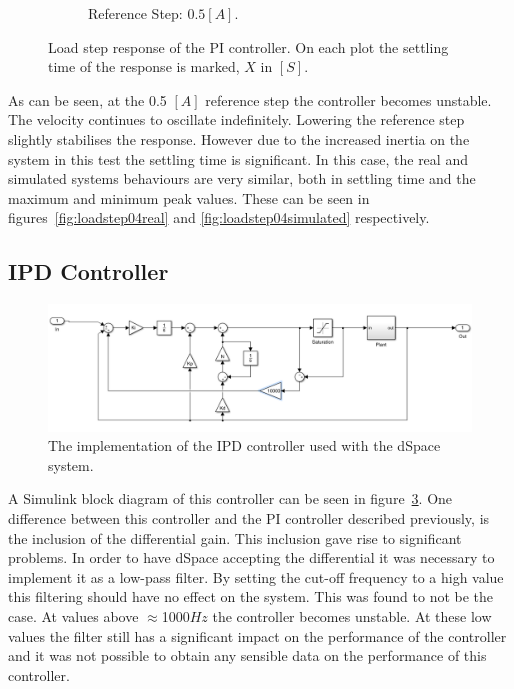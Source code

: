 \begin{figure}
\begin{subfigure}[t]{.49\linewidth}
		\caption{Reference Step: $0.5 [A]$.}
		\label{fig:}
	\end{subfigure}
	\caption[Load step response of PI controller]{Load step response of the PI controller. On each plot the settling time of the response is marked, $X$ in $[S]$.}
	\label{fig:loadstep}
\end{figure}

As can be seen, at the 0.5 $[A]$ reference step the controller becomes unstable.
The velocity continues to oscillate indefinitely.
Lowering the reference step slightly stabilises the response.
However due to the increased inertia on the system in this test the settling time is significant.
In this case, the real and simulated systems behaviours are very similar, both in settling time and the maximum and minimum peak values.
These can be seen in figures~\ref{fig:loadstep04real} and \ref{fig:loadstep04simulated} respectively.

\subsection{IPD Controller}
\begin{figure}[!h]
	\centering
	\includegraphics[width=.75\linewidth]{graphics/ipd_controller}
	\caption{The implementation of the IPD controller used with the dSpace system.}
	\label{fig:ipdcontroller}
\end{figure}

A Simulink block diagram of this controller can be seen in figure~\ref{fig:ipdcontroller}.
One difference between this controller and the PI controller described previously, is the inclusion of the differential gain. 
This inclusion gave rise to significant problems.
In order to have dSpace accepting the differential it was necessary to implement it as a low-pass filter.
By setting the cut-off frequency to a high value this filtering should have no effect on the system.
This was found to not be the case. 
At values above $\approx$1000$Hz$ the controller becomes unstable.
At these low values the filter still has a significant impact on the performance of the controller and it was not possible to obtain any sensible data on the performance of this controller.